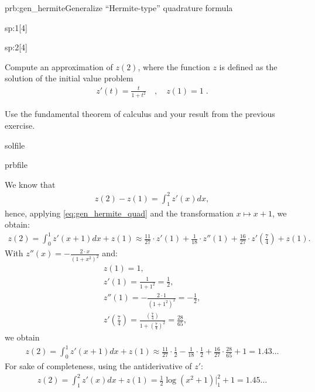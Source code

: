 \begin{samproblem}{prb:gen_hermite}{Generalize ``Hermite-type'' quadrature formula}
\begin{subproblem}{sp:1}[4]
\end{subproblem}
 
\begin{subproblem}{sp:2}[4]
 
  Compute an approximation of $z(2)$, where the function $z$ is defined as the solution of the initial value problem
  \begin{align}
    z'(t) = \frac{t}{1 + t^2}\quad,\quad z(1) = 1\;.
  \end{align}

  \begin{samhint}
    Use the fundamental theorem of calculus and your result from the previous exercise.
  \end{samhint}
 
  \begin{samwriteprbpart}{solfile}
    \begin{writeverbatim}{prbfile}
      \begin{samsolution}
        We know that
        \begin{align}
          z(2) - z(1) = \int_1^2 z'(x) dx,
        \end{align}
        hence, applying \eqref{eq:gen_hermite_quad} and the transformation $x \mapsto x + 1$, we obtain:
        \begin{align}
          z(2) = \int_0^1 z'(x + 1) dx + z(1) \approx \frac{11}{27} \cdot z'(1) + \frac{1}{18} \cdot z''(1) + \frac{16}{27} \cdot z'\left(\frac{7}{4}\right) + z(1).
        \end{align}
          With $z''(x) = - \frac{2 \cdot x}{(1 + x^2)^2}$ and:
        \begin{align*}
          z(1) = 1, \\
          z'(1) = \frac{1}{1 + 1^2} = \frac{1}{2}, \\
          z''(1) = - \frac{2 \cdot 1}{(1 + 1^2)^2} = -\frac{1}{2}, \\
          z'\left(\frac{7}{4}\right) = \frac{(\frac{7}{4})}{1 + (\frac{7}{4})^2} = \frac{28}{65},
        \end{align*}
        we obtain
        \begin{align*}
          z(2) = \int_0^1 z'(x + 1) dx + z(1) \approx \frac{11}{27} \cdot \frac{1}{2} - \frac{1}{18} \cdot \frac{1}{2} + \frac{16}{27} \cdot \frac{28}{65} + 1 = 1.43 \dots
        \end{align*}
        For sake of completeness, using the antiderivative of $z'$:
        \begin{align*}
          z(2) = \int_1^2 z'(x) dx + z(1) = \frac{1}{2} \log(x^2 + 1) |_1^2 + 1 = 1.45 \dots
        \end{align*}
      \end{samsolution}
    \end{writeverbatim}
  \end{samwriteprbpart}

\end{subproblem}
 
\end{samproblem}

